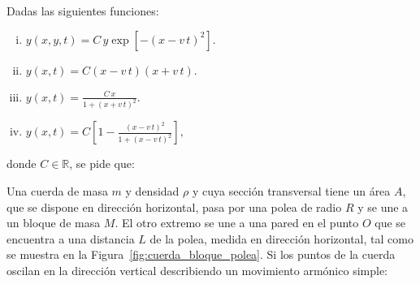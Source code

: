 \documentclass[addpoints]{exam}
\newcommand{\rr}{\mathbb{R}}
\begin{document}
\begin{questions}

    \question Dadas las siguientes funciones:
    \begin{enumerate}[i)]
        \item $y\left(x,y,t\right) = C \, y \exp \left[- \left(x-v \, t\right)^2\right].$
        \item $y \left(x,t\right) = C \left(x-v\,t\right) \left(x+v\,t\right).$
        \item $y\left(x,t\right) = \frac{C \, x}{1 + \left(x + v \, t\right)^2}.$
        \item $y\left(x,t\right) = C \left[1 - \frac{\left(x - v \, t\right)^2}{1 + \left(x - v \, t\right)^2}\right],$
    \end{enumerate} donde $C \in \rr$, se pide que:

    \question Una cuerda de masa $m$ y densidad $\rho$ y cuya sección transversal tiene un área $A$, que se dispone en dirección horizontal, pasa por una polea de radio $R$ y se une a un bloque de masa $M$. El otro extremo se une a una pared en el punto $O$ que se encuentra a una distancia $L$ de la polea, medida en dirección horizontal, tal como se muestra en la Figura~\ref{fig:cuerda_bloque_polea}. Si los puntos de la cuerda oscilan en la dirección vertical describiendo un movimiento armónico simple: \label{ej:cuerda_bloque_polea}
\end{questions}
\end{document}
